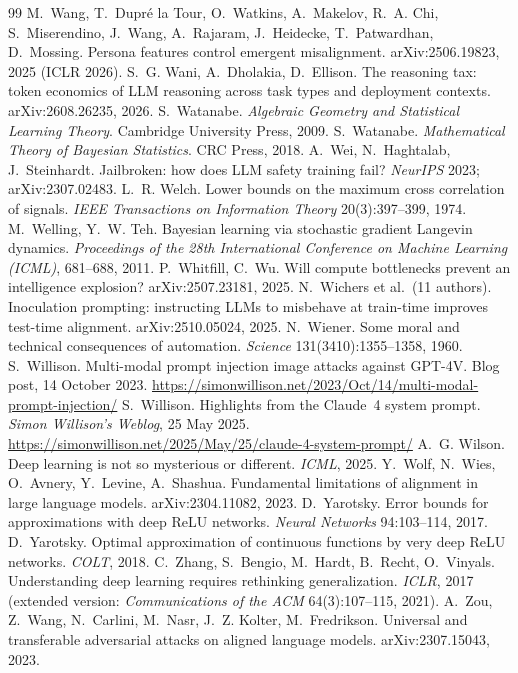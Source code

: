\begin{thebibliography}{99}
 M.~Wang, T.~Dupr\'e la Tour, O.~Watkins, A.~Makelov, R.~A. Chi, S.~Miserendino, J.~Wang, A.~Rajaram, J.~Heidecke, T.~Patwardhan, D.~Mossing. Persona features control emergent misalignment. arXiv:2506.19823, 2025 (ICLR 2026).
 S.~G. Wani, A.~Dholakia, D.~Ellison. The reasoning tax: token economics of LLM reasoning across task types and deployment contexts. arXiv:2608.26235, 2026.
 S.~Watanabe. \emph{Algebraic Geometry and Statistical Learning Theory}. Cambridge University Press, 2009.
 S.~Watanabe. \emph{Mathematical Theory of Bayesian Statistics}. CRC Press, 2018.
 A.~Wei, N.~Haghtalab, J.~Steinhardt. Jailbroken: how does LLM safety training fail? \emph{NeurIPS} 2023; arXiv:2307.02483.
 L.~R. Welch. Lower bounds on the maximum cross correlation of signals. \emph{IEEE Transactions on Information Theory} 20(3):397--399, 1974.
 M.~Welling, Y.~W. Teh. Bayesian learning via stochastic gradient Langevin dynamics. \emph{Proceedings of the 28th International Conference on Machine Learning (ICML)}, 681--688, 2011.
 P.~Whitfill, C.~Wu. Will compute bottlenecks prevent an intelligence explosion? arXiv:2507.23181, 2025.
 N.~Wichers et al.\ (11 authors). Inoculation prompting: instructing LLMs to misbehave at train-time improves test-time alignment. arXiv:2510.05024, 2025.
 N.~Wiener. Some moral and technical consequences of automation. \emph{Science} 131(3410):1355--1358, 1960.
 S.~Willison. Multi-modal prompt injection image attacks against GPT-4V. Blog post, 14 October 2023. \url{https://simonwillison.net/2023/Oct/14/multi-modal-prompt-injection/}
 S.~Willison. Highlights from the Claude~4 system prompt. \emph{Simon Willison's Weblog}, 25 May 2025. \url{https://simonwillison.net/2025/May/25/claude-4-system-prompt/}
 A.~G. Wilson. Deep learning is not so mysterious or different. \emph{ICML}, 2025.
 Y.~Wolf, N.~Wies, O.~Avnery, Y.~Levine, A.~Shashua. Fundamental limitations of alignment in large language models. arXiv:2304.11082, 2023.
 D.~Yarotsky. Error bounds for approximations with deep ReLU networks. \emph{Neural Networks} 94:103--114, 2017.
 D.~Yarotsky. Optimal approximation of continuous functions by very deep ReLU networks. \emph{COLT}, 2018.
 C.~Zhang, S.~Bengio, M.~Hardt, B.~Recht, O.~Vinyals. Understanding deep learning requires rethinking generalization. \emph{ICLR}, 2017 (extended version: \emph{Communications of the ACM} 64(3):107--115, 2021).
 A.~Zou, Z.~Wang, N.~Carlini, M.~Nasr, J.~Z. Kolter, M.~Fredrikson. Universal and transferable adversarial attacks on aligned language models. arXiv:2307.15043, 2023.
\end{thebibliography}
